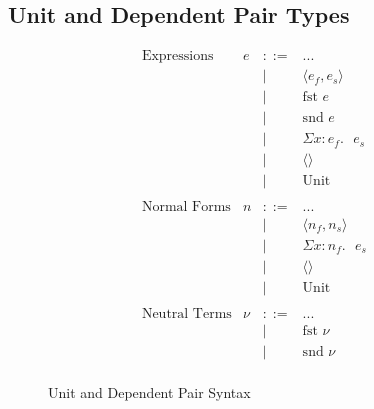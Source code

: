 \documentclass{article}
\newcommand{\bnfdef}{::=}
\newcommand{\bnfalt}{\mid}
\newcommand{\pairE}[2]{\langle #1, #2 \rangle}
\newcommand{\fstE}[1]{\text{fst } #1}
\newcommand{\sndE}[1]{\text{snd } #1}
\newcommand{\sigmaE}[3]{\Sigma #1 : #2. \text{ } #3}
\newcommand{\unitE}{\langle \rangle}
\newcommand{\unittE}{\text{Unit}}
\begin{document}
\subsection{Unit and Dependent Pair Types}

\begin{figure}[h]
  \begin{displaymath}
    \begin{array}{lrcll}
      \text{Expressions} & e & \bnfdef & ... & \\
      & & \bnfalt & \pairE{e_f}{e_s} & \\
      & & \bnfalt & \fstE{e} & \\
      & & \bnfalt & \sndE{e} & \\
      & & \bnfalt & \sigmaE{x}{e_f}{e_s} & \\
      & & \bnfalt & \unitE & \\
      & & \bnfalt & \unittE & \\
      \\
      \text{Normal Forms} & n & \bnfdef & ... & \\
      & & \bnfalt & \pairE{n_f}{n_s} & \\
      & & \bnfalt & \sigmaE{x}{n_f}{e_s} & \\
      & & \bnfalt & \unitE & \\
      & & \bnfalt & \unittE & \\
      \\
      \text{Neutral Terms} & \nu & \bnfdef & ... & \\
      & & \bnfalt & \fstE{\nu} & \\
      & & \bnfalt & \sndE{\nu} & \\
    \end{array}
  \end{displaymath}
  \caption{Unit and Dependent Pair Syntax}
  \label{fig:unit-dependent-pair-syntax}
\end{figure}
\end{document}
